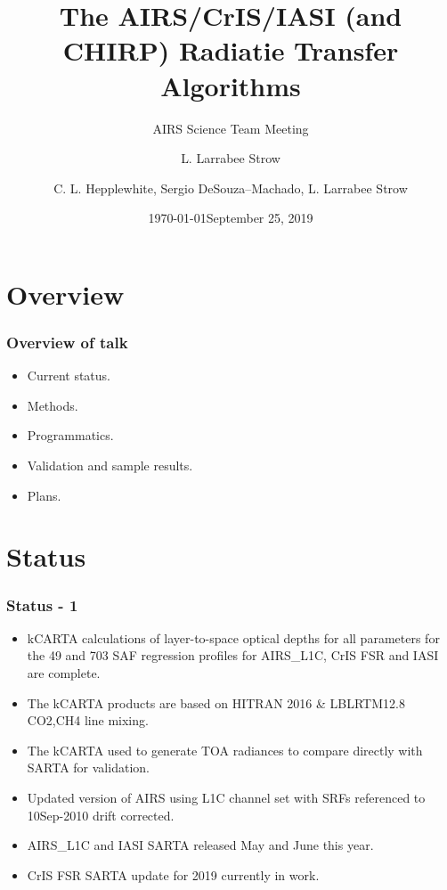 \documentclass[10pt,t]{beamer}
\author{L. Larrabee Strow}
\date{\today}
\title{\large The AIRS/CrIS/IASI (and CHIRP) \newline
 Radiatie Transfer Algorithms }
\subtitle{\footnotesize{AIRS Science Team Meeting}}
\date{\vspace{0.1in}\footnotesize{September 25, 2019 \vfill}}
\author{C. L. Hepplewhite\inst{1,2}, Sergio DeSouza--Machado\inst{1,2}, L. Larrabee Strow\inst{1,2}\inst{1,2}}
\institute[UMBC]{\inst{1} UMBC Physics Dept. \and \inst{2}UMBC JCET}
\begin{document}
\maketitle
{}

\section{Overview}
\begin{frame}
  \frametitle{Overview of talk}
  \begin{itemize}
  \item Current status.
  \item Methods.
  \item Programmatics.
  \item Validation and sample results.
  \item Plans.
    
  \end{itemize}
\end{frame}

\section{Status}
\begin{frame}
  \frametitle{Status - 1}
  \begin{itemize}
  \item kCARTA calculations of layer-to-space optical depths for all parameters for the 49 and 703 SAF regression profiles for AIRS\_L1C, CrIS FSR and IASI are complete. 
  \item The kCARTA products are based on HITRAN 2016 \& LBLRTM12.8 CO2,CH4 line mixing.
  \item The kCARTA used to generate TOA radiances to compare directly with SARTA for validation.
  \item Updated version of AIRS using L1C channel set with SRFs referenced to 10Sep-2010 drift corrected. 
  \item AIRS\_L1C and IASI SARTA released May and June this year.
  \item CrIS FSR SARTA update for 2019 currently in work.
  
  \end{itemize}
\end{frame}
\end{document}
